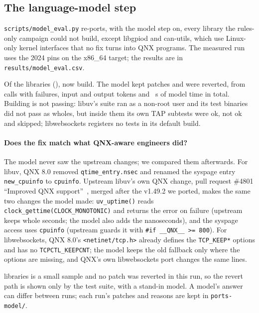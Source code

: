 \documentclass[conference]{IEEEtran}
\begin{document}
\subsection{The language-model step}\label{sec:eval-model}
\texttt{scripts/model\_eval.py} re-ports, with the model step on, every library the rules-only campaign could not
build, except libgpiod and can-utils, which use Linux-only kernel interfaces that no fix turns into QNX programs.
The measured run uses the 2024 pins on the x86\_64 target; the results are in \texttt{results/model\_eval.csv}.

Of the  libraries (),  now build. The model kept
 patches and  were reverted, from  calls with
 failures,  input and  output tokens and
~s of model time in total. Building is not passing: libuv's suite ran as a non-root user and
its  test binaries did not pass as wholes, but inside them its own TAP subtests were
 ok,  not ok and  skipped; libwebsockets registers no
tests in its default build.

\paragraph{Does the fix match what QNX-aware engineers did?}
The model never saw the upstream changes; we compared them afterwards. For libuv, QNX 8.0 removed
\texttt{qtime\_entry.nsec} and renamed the syspage entry \texttt{new\_cpuinfo} to \texttt{cpuinfo}. Upstream
libuv's own QNX change, pull request \#4801 ``Improved QNX support''~\cite{libuvpr}, merged after the v1.49.2 we
ported, makes the same two changes the model made: \texttt{uv\_uptime()} reads
\texttt{clock\_gettime(CLOCK\_MONOTONIC)} and returns the error on failure (upstream keeps whole seconds; the
model also adds the nanoseconds), and the syspage access uses \texttt{cpuinfo} (upstream guards it with
\texttt{\#if \_\_QNX\_\_ >= 800}). For libwebsockets, QNX 8.0's \texttt{<netinet/tcp.h>} already defines the
\texttt{TCP\_KEEP*} options and has no \texttt{TCPCTL\_KEEPCNT}; the model keeps the old fallback only where the
options are missing, and QNX's own libwebsockets port changes the same lines.

 libraries is a small sample and no patch was reverted in this run, so the revert path is shown only by the
test suite, with a stand-in model. A model's answer can differ between runs; each run's patches and reasons are
kept in \texttt{ports-model/}.
\end{document}
